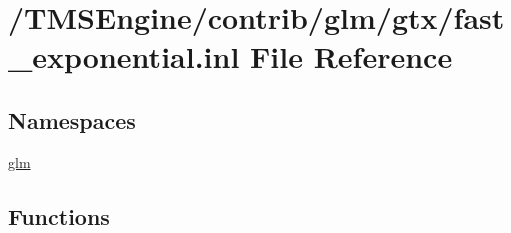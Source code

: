 \hypertarget{fast__exponential_8inl}{}\section{/\+T\+M\+S\+Engine/contrib/glm/gtx/fast\+\_\+exponential.inl File Reference}
\label{fast__exponential_8inl}
\subsection*{Namespaces}
\begin{DoxyCompactItemize}
\item 
 \hyperlink{namespaceglm}{glm}
\end{DoxyCompactItemize}
\subsection*{Functions}
